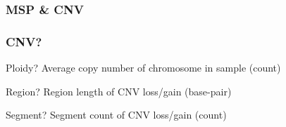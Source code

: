 \documentclass{beamer}
\begin{document}
            \subsubsection{MSP \& CNV}
                \begin{frame}
                    \frametitle{CNV?}

                    \begin{block}{Ploidy?}
                        Average copy number of chromosome in sample (count)
                    \end{block}

                    \begin{block}{Region?}
                        Region length of CNV loss/gain (base-pair)
                    \end{block}

                    \begin{block}{Segment?}
                        Segment count of CNV loss/gain (count)
                    \end{block}
                \end{frame}
\end{document}
